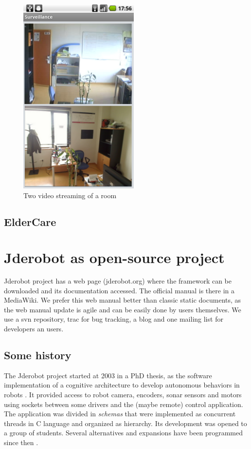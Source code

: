 \documentclass[twocolumn]{svjour3}          %
\begin{document}
\begin{figure}
\includegraphics[width=6cm]{figs/surveillance-streaming2-recording.png}
\caption{Two video streaming of a room}
\label{fig:surveillance3}
\end{figure}


\subsection{ElderCare}

\section{Jderobot as open-source project}

Jderobot project has a web page (jderobot.org) where the framework can be downloaded and its documentation accessed. The official manual is there in a MediaWiki. We prefer this web manual better than classic static documents, as the web manual update is agile and can be easily done by users themselves. We use a svn repository, trac for bug tracking, a blog and one mailing list for developers an users.

\subsection{Some history}

The Jderobot project started at 2003 in a PhD thesis, as the software implementation of a cognitive architecture to develop autonomous behaviors in robots \cite{canas02,canas05e}. It provided access to robot camera, encoders, sonar sensors and motors using sockets between some drivers and the (maybe remote) control application. The application was divided in \textit{schemas} that were implemented as concurrent threads in C language and organized as hierarchy. Its development was opened to a group of students. Several alternatives and expansions have been programmed since then \cite{canas07,canas07f}. 
\end{document}
